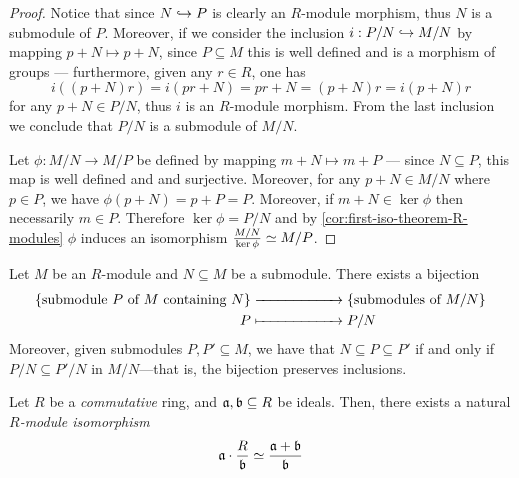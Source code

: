 \begin{proof}
Notice that since \(N \hookrightarrow P\) is clearly an \(R\)-module morphism, thus \(N\)
is a submodule of \(P\). Moreover, if we consider the inclusion
\(i: P/N \hookrightarrow M/N\) by mapping \(p + N \mapsto p + N\), since \(P \subseteq M\)
this is well defined and is a morphism of groups --- furthermore, given any
\(r \in R\), one has
\[
i((p + N) r) = i(p r + N) = p r + N = (p + N) r = i(p + N) r
\]
for any \(p + N \in P/N\), thus \(i\) is an \(R\)-module morphism. From the last
inclusion we conclude that \(P/N\) is a submodule of \(M/N\).

Let \(\phi: M/N \to M/P\) be defined by mapping \(m + N \mapsto m + P\) ---
since \(N \subseteq P\), this map is well defined and and surjective. Moreover,
for any \(p + N \in M/N\) where \(p \in P\), we have
\(\phi(p + N) = p + P = P\). Moreover, if \(m + N \in \ker \phi\) then
necessarily \(m \in P\). Therefore \(\ker \phi = P/N\) and by
\cref{cor:first-iso-theorem-R-modules} \(\phi\) induces an isomorphism
\(\frac{M/N}{\ker \phi} \simeq M/P\).
\end{proof}

\begin{corollary}
\label{cor:submodule-correspondence}
Let \(M\) be an \(R\)-module and \(N \subseteq M\) be a submodule. There exists
a bijection
\begin{align*}
  \{\text{submodule } P \text{ of } M \text{ containing } N\}
  &\xrightarrow{\hspace*{2cm}}\{\text{submodules of } M/N
  \} \\
  P &\xmapsto{\hspace*{2cm}} P/N
\end{align*}
Moreover, given submodules \(P, P' \subseteq M\), we have that \(N \subseteq P
\subseteq P'\) if and only if \(P/N \subseteq P'/N\) in \(M/N\)---that is, the
bijection preserves inclusions.
\end{corollary}

\begin{proposition}
\label{prop:a*R/b-iso-a+b/b}
Let \(R\) be a \emph{commutative} ring, and \(\mathfrak{a}, \mathfrak{b} \subseteq R\)
be ideals. Then, there exists a natural \emph{\(R\)-module isomorphism}
\[
\mathfrak{a} \cdot \frac{R}{\mathfrak{b}}
\simeq \frac{\mathfrak{a} + \mathfrak{b}}{\mathfrak{b}}
\]
\end{proposition}

